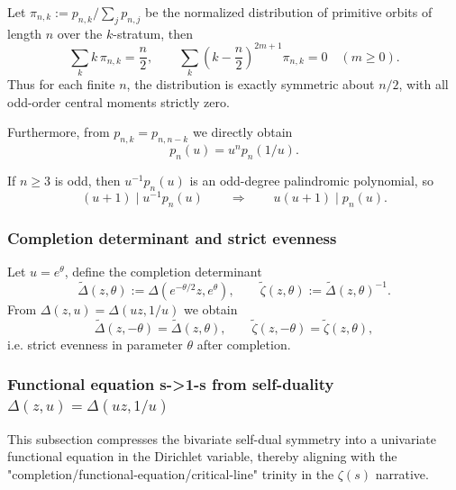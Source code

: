 \begin{corollary}\label{cor:primitive-finite-sym}
Let $\pi_{n,k}:=p_{n,k}/\sum_j p_{n,j}$ be the normalized distribution of primitive orbits of length $n$ over the $k$-stratum, then
\[
\sum_k k\,\pi_{n,k}=\frac{n}{2},\qquad
\sum_k\left(k-\frac{n}{2}\right)^{2m+1}\pi_{n,k}=0\quad(m\ge 0).
\]
Thus for each finite $n$, the distribution is exactly symmetric about $n/2$, with all odd-order central moments strictly zero.
\end{corollary}

Furthermore, from $p_{n,k}=p_{n,n-k}$ we directly obtain
\[
p_n(u)=u^n p_n(1/u).
\]

\begin{corollary}\label{cor:primitive-odd-div}
If $n\ge 3$ is odd, then $u^{-1}p_n(u)$ is an odd-degree palindromic polynomial, so
\[
(u+1)\mid u^{-1}p_n(u)\qquad\Longrightarrow\qquad u(u+1)\mid p_n(u).
\]
\end{corollary}

\subsubsection{Completion determinant and strict evenness}\label{app:kernel-completion}
Let $u=e^\theta$, define the completion determinant
\[
\widetilde{\Delta}(z,\theta):=\Delta(e^{-\theta/2}z,e^\theta),
\qquad
\widetilde{\zeta}(z,\theta):=\widetilde{\Delta}(z,\theta)^{-1}.
\]
From $\Delta(z,u)=\Delta(uz,1/u)$ we obtain
\[
\widetilde{\Delta}(z,-\theta)=\widetilde{\Delta}(z,\theta),
\qquad
\widetilde{\zeta}(z,-\theta)=\widetilde{\zeta}(z,\theta),
\]
i.e. strict evenness in parameter $\theta$ after completion.

\subsubsection{Functional equation s->1-s from self-duality \texorpdfstring{$\Delta(z,u)=\Delta(uz,1/u)$}{Delta(z,u)=Delta(uz,1/u)}}\label{app:kernel-functional-equation}
This subsection compresses the bivariate self-dual symmetry into a univariate functional equation in the Dirichlet variable, thereby aligning with the "completion/functional-equation/critical-line" trinity in the \(\zeta(s)\) narrative.

